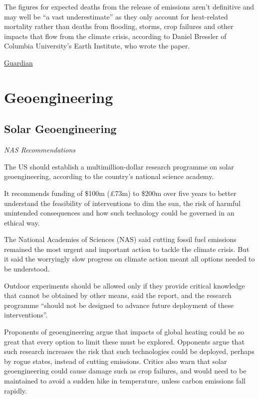 \documentclass[
]{book}
\begin{document}
The figures for expected deaths from the release of emissions aren't definitive and may well be ``a vast underestimate'' as they only account for heat-related mortality rather than deaths from flooding, storms, crop failures and other impacts that flow from the climate crisis, according to Daniel Bressler of Columbia University's Earth Institute, who wrote the paper.

\href{https://www.theguardian.com/environment/2021/jul/29/carbon-emissions-americans-social-cost}{Guardian}

\hypertarget{geoengineering}{%
\chapter{Geoengineering}\label{geoengineering}}

\hypertarget{solar-geoengineering}{%
\section{Solar Geoengineering}\label{solar-geoengineering}}

\emph{NAS Recommendations}

The US should establish a multimillion-dollar research programme on solar geoengineering, according to the country's national science academy.

It recommends funding of \$100m (£73m) to \$200m over five years to better understand the feasibility of interventions to dim the sun, the risk of harmful unintended consequences and how such technology could be governed in an ethical way.

The National Academies of Sciences (NAS) said cutting fossil fuel emissions remained the most urgent and important action to tackle the climate crisis. But it said the worryingly slow progress on climate action meant all options needed to be understood.

Outdoor experiments should be allowed only if they provide critical knowledge that cannot be obtained by other means, said the report, and the research programme ``should not be designed to advance future deployment of these interventions''.

Proponents of geoengineering argue that impacts of global heating could be so great that every option to limit these must be explored. Opponents argue that such research increases the risk that such technologies could be deployed, perhaps by rogue states, instead of cutting emissions. Critics also warn that solar geoengineering could cause damage such as crop failures, and would need to be maintained to avoid a sudden hike in temperature, unless carbon emissions fall rapidly.
\end{document}
